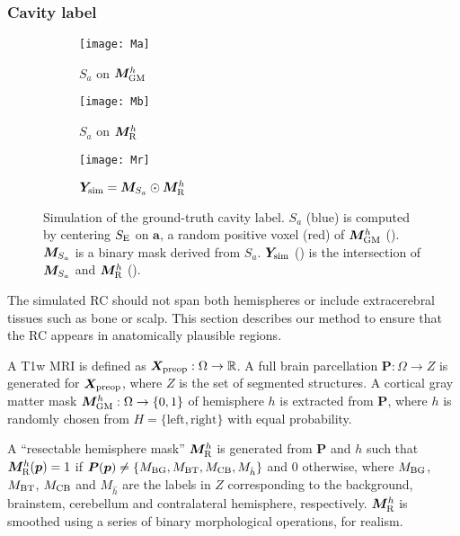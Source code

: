 \subsubsection{Cavity label}
\label{sec:cavity_constrain}


\begin{figure}
  \centering
  \begin{subfigure}{0.3\textwidth}
    \texttt{[image: Ma]}
    \caption{$S_a$ on $\bm{M}_{\text{GM}}^h$\label{fig:sama}}
  \end{subfigure}
  \begin{subfigure}{0.3\textwidth}
    \texttt{[image: Mb]}
    \caption{$S_a$ on $\bm{M}_{\text{R}}^h$\label{fig:samb}}
  \end{subfigure}
  \begin{subfigure}{0.3\textwidth}
    \texttt{[image: Mr]}
    \caption{$\bm{Y}_{\text{sim}} = \bm{M}_{S_a} \odot \bm{M}_{\text{R}}^h$\label{fig:mr}}
  \end{subfigure}

  \caption[Simulation of the ground-truth cavity label]{
    Simulation of the ground-truth cavity label.
    $S_a$ (blue) is computed by centering $S_{\text{E}}$ on $\bm{a}$, a random positive voxel (red) of $\bm{M}_{\text{GM}}^h$ ().
    $\bm{M}_{S_a}$ is a binary mask derived from $S_a$.
    $\bm{Y}_{\text{sim}}$ () is the intersection of $\bm{M}_{S_a}$ and $\bm{M}_{\text{R}}^h$ ().
  }
  \label{fig:shape}
\end{figure}



The simulated \ac{RC} should not span both hemispheres or include extracerebral tissues such as bone or scalp.
This section describes our method to ensure that the \ac{RC} appears in anatomically plausible regions.

A \ac{T1w} \ac{MRI} is defined as $\bm{X}_{\text{preop}} : \Omega \to \mathbb{R}$.
A full brain parcellation $\bm{P} : \Omega \to Z$ is generated \cite{cardoso_geodesic_2015} for $\bm{X}_{\text{preop}}$,
where $Z$ is the set of segmented structures.
A cortical gray matter mask $\bm{M}_{\text{GM}}^h : \Omega \to \{0, 1\}$
of hemisphere $h$ is extracted from $\bm{P}$,
where $h$ is randomly chosen from $H = \{\text{left}, \text{right}\}$ with equal probability.

A ``resectable hemisphere mask'' $\bm{M}_{\text{R}}^h$ is generated from $\bm{P}$ and $h$ such that $\bm{M}_{\text{R}}^h (\bm{p}) = 1$ if
${\bm{P}(\bm{p}) \neq \{M_{\text{BG}}, M_{\text{BT}}, M_{\text{CB}}, M_{\hat{h}} \} }$
and $0$ otherwise,
where $M_{\text{BG}}$, $M_{\text{BT}}$, $M_{\text{CB}}$ and $M_{\hat{h}}$ are the labels in $Z$ corresponding to the background, brainstem, cerebellum and contralateral hemisphere, respectively.
$\bm{M}_{\text{R}}^h$ is smoothed using a series of binary morphological operations, for realism.



